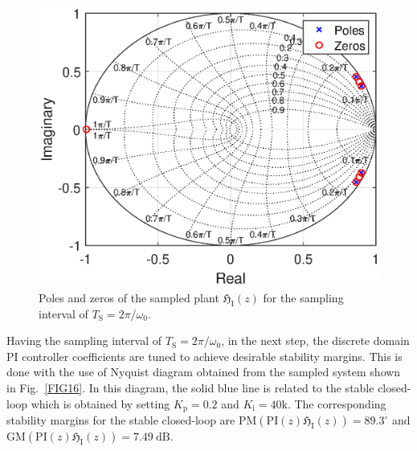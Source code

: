 \documentclass[journal,a4paper,10pt,twoside]{IEEEtran} %
\begin{document}
	 \begin{figure}
	     \centering
	     \includegraphics[clip, trim=0.7cm 0cm 1cm 0cm, width=1\columnwidth]{FIGS/FIG15.eps}
	     \caption{Poles and zeros of the sampled plant $\mathfrak{H}_\mathrm{I}(z)$ for the sampling interval of $T_\mathrm{S}=2\pi/\omega_0$.}
	     \label{FIG15}
	     \vspace{-3mm}
	 \end{figure}
	 
	 Having the sampling interval of $T_\mathrm{S}=2\pi/\omega_0$, in the next step, the discrete domain PI controller coefficients are tuned to achieve desirable stability margins. This is done with the use of Nyquist diagram obtained from the sampled system shown in Fig.~\ref{FIG16}. In this diagram, the solid blue line is related to the stable closed-loop which is obtained by setting $K_\mathrm{p}=0.2$ and $K_\mathrm{i}=40\mathrm{k}$. The corresponding stability margins for the stable closed-loop are $\mathrm{PM}(\mathrm{PI}(z)\mathfrak{H}_\mathrm{I}(z))=89.3^\circ$ and $\mathrm{GM}(\mathrm{PI}(z)\mathfrak{H}_\mathrm{I}(z))=7.49~\mathrm{dB}$.
\end{document}
